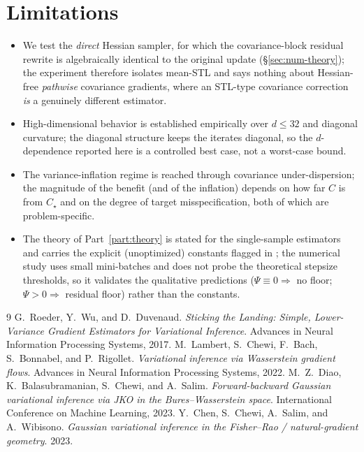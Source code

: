 \documentclass[11pt]{article}
\theoremstyle{plain}
\theoremstyle{definition}
\theoremstyle{remark}
\begin{document}
\section{Limitations}
\label{sec:limitations}

\begin{itemize}
\item We test the \emph{direct} Hessian sampler, for which the covariance-block
residual rewrite is algebraically identical to the original update
(\S\ref{sec:num-theory}); the experiment therefore isolates mean-STL and says nothing
about Hessian-free \emph{pathwise} covariance gradients, where an STL-type
covariance correction \emph{is} a genuinely different estimator.
\item High-dimensional behavior is established empirically over $d\le 32$ and
diagonal curvature; the diagonal structure keeps the iterates diagonal, so the
$d$-dependence reported here is a controlled best case, not a worst-case bound.
\item The variance-inflation regime is reached through covariance
under-dispersion; the magnitude of the benefit (and of the inflation) depends on
how far $C$ is from $C_\star$ and on the degree of target misspecification, both
of which are problem-specific.
\item The theory of Part~\ref{part:theory} is stated for the single-sample
estimators and carries the explicit (unoptimized) constants flagged in
; the numerical study uses small mini-batches and does not
probe the theoretical stepsize thresholds, so it validates the qualitative
predictions ($\Psi\equiv0\Rightarrow$ no floor; $\Psi>0\Rightarrow$ residual
floor) rather than the constants.
\end{itemize}

\begin{thebibliography}{9}
 G.~Roeder, Y.~Wu, and D.~Duvenaud.
\emph{Sticking the Landing: Simple, Lower-Variance Gradient Estimators for
Variational Inference}. Advances in Neural Information Processing Systems, 2017.
 M.~Lambert, S.~Chewi, F.~Bach, S.~Bonnabel, and
P.~Rigollet. \emph{Variational inference via Wasserstein gradient flows}. Advances
in Neural Information Processing Systems, 2022.
 M.~Z.~Diao, K.~Balasubramanian, S.~Chewi, and A.~Salim.
\emph{Forward-backward Gaussian variational inference via JKO in the
Bures--Wasserstein space}. International Conference on Machine Learning, 2023.
 Y.~Chen, S.~Chewi, A.~Salim, and A.~Wibisono.
\emph{Gaussian variational inference in the Fisher--Rao / natural-gradient
geometry}. 2023.
\end{thebibliography}
\end{document}
